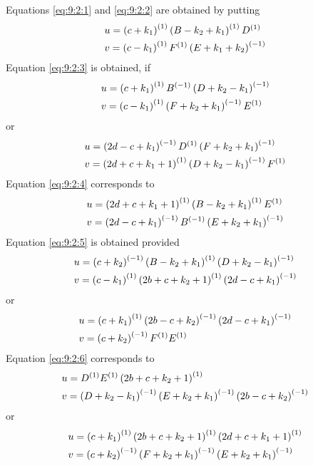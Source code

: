 Equations \eqref{eq:9:2:1} and \eqref{eq:9:2:2} are obtained by putting
\begin{align}
& u=\left(c+k_{1}\right)^{(1)}\left(B-k_{2}+k_{1}\right)^{(1)} D^{(1)}  \notag\\
& v=\left(c-k_{1}\right)^{(1)} F^{(1)}\left(E+k_{1}+k_{2}\right)^{(-1)} \label{eq:9:2:16}
\end{align}
Equation \eqref{eq:9:2:3} is obtained, if
\begin{align}
& u=\left(c+k_{1}\right)^{(1)} B^{(-1)}\left(D+k_{2}-k_{1}\right)^{(-1)}  \notag\\
& v=\left(c-k_{1}\right)^{(1)}\left(F+k_{2}+k_{1}\right)^{(-1)} E^{(1)} \label{eq:9:2:17}
\end{align}
or
\begin{align}
& u=\left(2 d-c+k_{1}\right)^{(-1)} D^{(1)}\left(F+k_{2}+k_{1}\right)^{(-1)}  \notag\\
& v=\left(2 d+c+k_{1}+1\right)^{(1)}\left(D+k_{2}-k_{1}\right)^{(-1)} F^{(1)} \label{eq:9:2:18}
\end{align}
Equation \eqref{eq:9:2:4} corresponds to
\begin{align}
& u=\left(2 d+c+k_{1}+1\right)^{(1)}\left(B-k_{2}+k_{1}\right)^{(1)} E^{(1)}  \notag\\
& v=\left(2 d-c+k_{1}\right)^{(-1)} B^{(-1)}\left(E+k_{2}+k_{1}\right)^{(-1)} \label{eq:9:2:19}
\end{align}
Equation \eqref{eq:9:2:5} is obtained provided
\begin{align}
& u=\left(c+k_{2}\right)^{(-1)}\left(B-k_{2}+k_{1}\right)^{(1)}\left(D+k_{2}-k_{1}\right)^{(-1)}  \notag\\
& v=\left(c-k_{1}\right)^{(1)}\left(2 b+c+k_{2}+1\right)^{(1)}\left(2 d-c+k_{1}\right)^{(-1)} \label{eq:9:2:20}
\end{align}
or
\begin{align}
& u=\left(c+k_{1}\right)^{(1)}\left(2 b-c+k_{2}\right)^{(-1)}\left(2 d-c+k_{1}\right)^{(-1)}  \label{eq:9:2:21}\\
& v=\left(c+k_{2}\right)^{(-1)} F^{(1)} E^{(1)} \notag
\end{align}
Equation \eqref{eq:9:2:6} corresponds to
\begin{align}
& u=D^{(1)} E^{(1)}\left(2 b+c+k_{2}+1\right)^{(1)}  \notag\\
& v=\left(D+k_{2}-k_{1}\right)^{(-1)}\left(E+k_{2}+k_{1}\right)^{(-1)}\left(2 b-c+k_{2}\right)^{(-1)} \label{eq:9:2:22}
\end{align}
or
\begin{align}
& u=\left(c+k_{1}\right)^{(1)}\left(2 b+c+k_{2}+1\right)^{(1)}\left(2 d+c+k_{1}+1\right)^{(1)}  \label{eq:9:2:23}\\
& v=\left(c+k_{2}\right)^{(-1)}\left(F+k_{2}+k_{1}\right)^{(-1)}\left(E+k_{2}+k_{1}\right)^{(-1)} \notag
\end{align}
